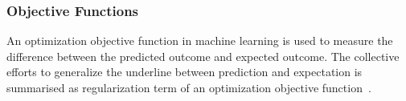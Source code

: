 \subsubsection{Objective Functions}
An optimization objective function in machine learning is used to measure the difference between the predicted outcome and expected outcome. The collective efforts to generalize the underline  between prediction and expectation is summarised as regularization term of an optimization objective function~\cite{goodfellow_2015}.  
